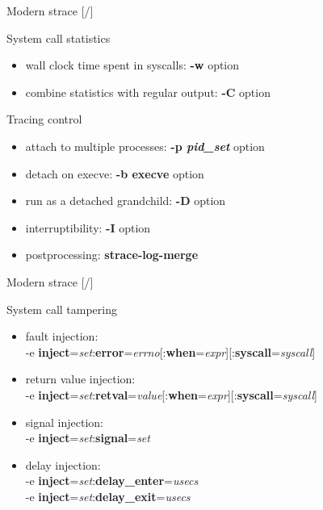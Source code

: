 \documentclass[unicode,aspectratio=169]{beamer}
\begin{document}
\begin{frame}{Modern strace \hfill [\insertframenumber/\inserttotalframenumber]}
\Large
\begin{block}{System call statistics}
\begin{itemize}
\item wall clock time spent in syscalls: \textbf{-w} option
\item combine statistics with regular output: \textbf{-C} option
\end{itemize}
\end{block}

\begin{block}{Tracing control}
\begin{itemize}
\item attach to multiple processes: \textbf{-p \textit{pid\_set}} option
\item detach on execve: \textbf{-b execve} option
\item run as a detached grandchild: \textbf{-D} option
\item interruptibility: \textbf{-I} option
\item postprocessing: \textbf{strace-log-merge}
\end{itemize}
\end{block}
\end{frame}

\begin{frame}{Modern strace \hfill [\insertframenumber/\inserttotalframenumber]}
\Large
\begin{block}{System call tampering}
\begin{itemize}
\item fault injection: \\
-e \textbf{inject}=\textit{set}:\textbf{error}=\textit{errno}[:\textbf{when}=\textit{expr}][:\textbf{syscall}=\textit{syscall}]
\item return value injection: \\
-e \textbf{inject}=\textit{set}:\textbf{retval}=\textit{value}[:\textbf{when}=\textit{expr}][:\textbf{syscall}=\textit{syscall}]
\item signal injection: \\
-e \textbf{inject}=\textit{set}:\textbf{signal}=\textit{set}
\item delay injection: \\
-e \textbf{inject}=\textit{set}:\textbf{delay\_enter}=\textit{usecs} \\
-e \textbf{inject}=\textit{set}:\textbf{delay\_exit}=\textit{usecs}
\end{itemize}
\end{block}
\end{frame}
\end{document}
